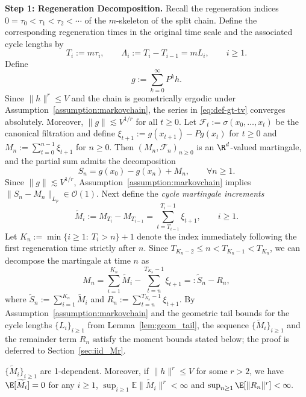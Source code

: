 \documentclass[mnsc,nonblindrev]{informs3}
\begin{document}
\medskip
\noindent\textbf{Step 1: Regeneration Decomposition.} Recall the regeneration indices $0=\tau_0<\tau_1<\tau_2<\cdots$ of the $m$-skeleton
of the split chain. Define the corresponding regeneration times in the original
time scale and the associated cycle lengths by
\begin{equation*}
T_i:=m\tau_i,\qquad \Lambda_i:=T_i-T_{i-1}=mL_i,\qquad i\ge 1.
\end{equation*}
Define
\begin{equation}\label{eq:def-gt-tv}
g:=\sum_{k=0}^\infty P^k h.
\end{equation}
Since $\|h\|^r\le V$ and the chain is geometrically ergodic under
Assumption~\ref{assumption:markovchain}, the series in \eqref{eq:def-gt-tv}
converges absolutely. Moreover, $\|g\|\lesssim V^{1/r}$ for all $t\ge 0$. Let $\mathcal F_t:=\sigma(x_0,\dots,x_t)$ be the canonical filtration and define $\xi_{t+1}:=g(x_{t+1})-Pg(x_t)$ for $t \geq 0$ and $M_n:=\sum_{t=0}^{n-1}\xi_{t+1}$ for $n\ge 0.$ Then $(M_n,\mathcal F_n)_{n\ge 0}$ is an $\R^d$-valued martingale, and the partial
sum admits the decomposition
\begin{equation}\label{eq:Sn-mart-tv}
S_n
=
g(x_0)-g(x_n)+M_n,
\qquad \forall n\ge 1.
\end{equation}
Since $\|g\|\lesssim V^{1/r}$, Assumption~\ref{assumption:markovchain} implies $\|S_n-M_n\|_{L_p} \in  \mathcal O(1)$. Next
define the \emph{cycle martingale increments}
\begin{equation*}
\widetilde M_i
:=M_{T_i}-M_{T_{i-1}}
=\sum_{t=T_{i-1}}^{T_i-1}\xi_{t+1},\qquad i\ge 1.
\end{equation*}
Let $K_n:=\min\{i\ge 1:\ T_i>n\}+1$ denote the index immediately following the first regeneration time strictly
after $n$. Since $T_{K_n-2}\le n<T_{K_n-1}<T_{K_n}$, we can decompose the
martingale at time $n$ as
\[
M_n
= \sum_{i=1}^{K_n}\widetilde M_i - \sum_{t=n}^{T_{K_n}-1}\xi_{t+1}
=: \widetilde S_n - R_n,
\]
where $\widetilde S_n:=\sum_{i=1}^{K_n}\widetilde M_i$ and
$R_n:=\sum_{t=n}^{T_{K_n}-1}\xi_{t+1}$. By Assumption~\ref{assumption:markovchain} and the geometric tail bounds for the
cycle lengths $\{L_i\}_{i\ge 1}$ from Lemma~\ref{lem:geom_tail}, the sequence
$\{\widetilde M_i\}_{i\ge 1}$ and the remainder term $R_n$ satisfy the moment
bounds stated below; the proof is deferred to Section~\ref{sec:iid_Mr}.
\begin{lemma}
\label{lem:iid_Mr}
$\{\widetilde M_i\}_{i\ge1}$ are 1-dependent. Moreover, if $\|h\|^r \leq V$ for some $r > 2$, we have $\E[\widetilde M_i]=0$ for any $i \geq 1$, $\sup_{i \geq 1}\mathbb E\|\widetilde M_i\|^{r}<\infty$ and $ \sup_{n \geq 1}\E[\|R_n\|^{r}] <\infty.$
\end{lemma}
\end{document}
